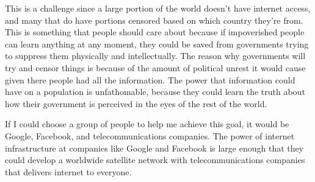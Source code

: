 \documentclass[12pt,letterpaper]{article}
\begin{document}
This is a challenge since a large portion of the world doesn’t have internet access, and many that do have portions censored based on which country they're from. This is something that people should care about because if impoverished people can learn anything at any moment, they could be saved from governments trying to suppress them physically and intellectually. The reason why governments will try and censor things is because of the amount of political unrest it would cause given there people had all the information. The power that information could have on a population is unfathomable, because they could learn the truth about how their government is perceived in the eyes of the rest of the world.\par

If I could choose a group of people to help me achieve this goal, it would be Google, Facebook, and telecommunications companies. The power of internet infrastructure at companies like Google and Facebook is large enough that they could develop a worldwide satellite network with telecommunications companies that delivers internet to everyone.
\end{document}

